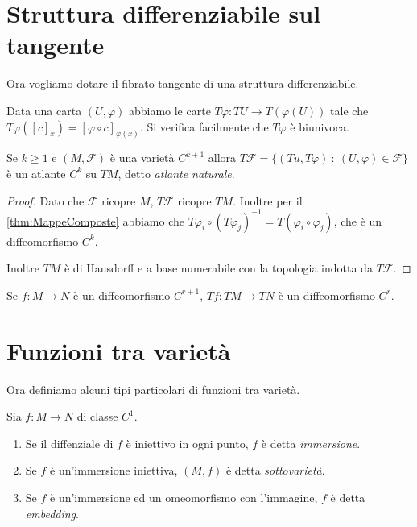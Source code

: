 \section{Struttura differenziabile sul tangente}
Ora vogliamo dotare il fibrato tangente di una struttura differenziabile.
 
Data una carta $(U,\varphi)$ abbiamo le carte $T\varphi:TU\to T(\varphi(U))$ tale che $T\varphi([c]_x)=[\varphi\circ c]_{\varphi(x)}$. Si verifica facilmente che $T\varphi$ è biunivoca.
 
\begin{proposition} 
	Se $k\ge 1$ e $(M,\mathcal F)$ è una varietà $C^{k+1}$ allora $T\mathcal F=\{(Tu,T\varphi)\ :\ (U,\varphi)\in\mathcal F\}$ è un atlante $C^k$ su $TM$, detto \emph{atlante naturale}.
\end{proposition}

\begin{proof}
	Dato che $\mathcal F$ ricopre $M$, $T\mathcal F$ ricopre $TM$. Inoltre per il \cref{thm:MappeComposte} abbiamo che  $T\varphi_i\circ(T\varphi_j)^{-1}=T(\varphi_i\circ\varphi_j)$, che è un diffeomorfismo $C^k$.
	
	Inoltre $TM$ è di Hausdorff e a base numerabile con la topologia indotta da $T\mathcal F$.
\end{proof}

\begin{proposition}
	Se $f:M\to N$ è un diffeomorfismo $C^{r+1}$, $Tf:TM\to TN$ è un diffeomorfismo $C^r$.
\end{proposition}

\section{Funzioni tra varietà}
Ora definiamo alcuni tipi particolari di funzioni tra varietà.
 
\begin{definition}
	Sia $f:M\to N$ di classe $C^1$.
	\begin{enumerate}
	\item Se il diffenziale di $f$ è iniettivo in ogni punto, $f$ è detta \emph{immersione}. 
	\item Se $f$ è un'immersione iniettiva, $(M,f)$ è detta \emph{sottovarietà}. 
	\item Se $f$ è un'immersione ed un omeomorfismo con l'immagine, $f$ è detta \emph{embedding}. 
	\end{enumerate}
\end{definition}

